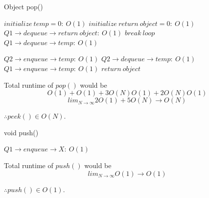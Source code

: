 \documentclass[journal]{IEEEtran}
\begin{document}
\begin{algorithm}
    \caption{Object pop()}
    \begin{algorithmic}
        \STATE $initialize~temp = 0:~O(1)$
        \STATE $initialize~return~object = 0:~O(1)$
        \STATE $Q1 \rightarrow dequeue \rightarrow return~object:~O(1)$
        \STATE $break~loop$
        \ENDIF
        \STATE $Q1 \rightarrow dequeue \rightarrow temp:~O(1)$
        
        \STATE $Q2 \rightarrow enqueue \rightarrow temp:~O(1)$
        \ENDFOR
        \STATE $Q2 \rightarrow dequeue \rightarrow temp:~O(1)$
        \STATE $Q1 \rightarrow enqueue \rightarrow temp:~O(1)$
        \ENDFOR
        \RETURN $return~object$
    \end{algorithmic}
\end{algorithm}

Total runtime of $pop()$ would be 
$$O(1) + O(1) + 3O(N)O(1) + 2O(N)O(1)$$
$$lim_{N \rightarrow \infty}2O(1) + 5O(N) \rightarrow O(N)$$

$\therefore peek() \in \boxed{O(N)}$.

\begin{algorithm}
    \caption{void push()}
    \begin{algorithmic}
        \STATE $Q1 \rightarrow enqueue \rightarrow X:~O(1)$
    \end{algorithmic}
\end{algorithm}

Total runtime of $push()$ would be 
$$lim_{N \rightarrow \infty}O(1) \rightarrow O(1)$$

$\therefore push() \in \boxed{O(1)}$.
\end{document}
